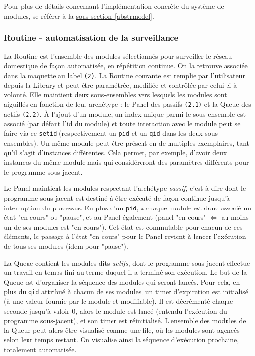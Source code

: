 \documentclass[]{article}
\newcommand{\wordlink}[2]{\hyperref[#1]{#2~\ref{#1}}}
\begin{document}
\vspace{0.5cm}

Pour plus de détails concernant l'implémentation concrète du système de modules, se référer à la \wordlink{abstrmodel}{sous-section}.

\subsubsection{Routine - automatisation de la surveillance}

La Routine est l'ensemble des modules sélectionnés pour surveiller le réseau domestique de façon automatisée, en répétition continue. On la retrouve associée dans la maquette au label \texttt{(2)}. La Routine courante est remplie par l'utilisateur depuis la Library et peut être paramétrée, modifiée et contrôlée par celui-ci à volonté. Elle maintient deux sous-ensembles vers lesquels les modules sont aiguillés en fonction de leur archétype : le Panel des passifs \texttt{(2.1)} et la Queue des actifs \texttt{(2.2)}. À l'ajout d'un module, un index unique parmi le sous-ensemble est associé (par défaut l'id du module) et toute interaction avec le module peut se faire via ce \texttt{setid} (respectivement un \texttt{pid} et un \texttt{qid}  dans les deux sous-ensembles). Un même module peut être présent en de multiples exemplaires, tant qu'il s'agit d'instances différentes. Cela permet, par exemple, d'avoir deux instances du même module mais qui considéreront des paramètres différents pour le programme sous-jacent.\\

\par Le Panel maintient les modules respectant l'archétype \textit{passif}, c'est-à-dire dont le programme sous-jacent est destiné à être exécuté de façon continue jusqu'à interruption du processus. En plus d'un \texttt{pid}, à chaque module est donc associé un état "en cours" ou "pause", et au Panel également (panel "en cours" $\Leftrightarrow$ au moins un de ses modules est "en cours"). Cet état est commutable pour chacun de ces éléments, le passage à l'état "en cours" pour le Panel revient à lancer l'exécution de tous ses modules (idem pour "pause").\\

\par La Queue contient les modules dits \textit{actifs}, dont le programme sous-jacent effectue un travail en temps fini au terme duquel il a terminé son exécution. Le but de la Queue est d'organiser la séquence des modules qui seront lancés. Pour cela, en plus du \texttt{qid} attribué à chacun de ses modules, un timer d'expiration est initialisé (à une valeur fournie par le module et modifiable). Il est décrémenté chaque seconde jusqu'à valoir 0, alors le module est lancé (entendu l'exécution du programme sous-jacent), et son timer est réinitialisé. L'ensemble des modules de la Queue peut alors être visualisé comme une file, où les modules sont agencés selon leur temps restant. On visualise ainsi la séquence d'exécution prochaine, totalement automatisée.
\end{document}

